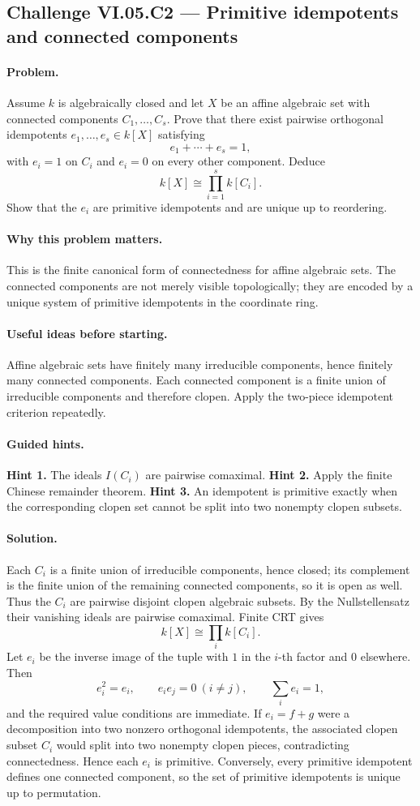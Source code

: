 \subsection*{Challenge VI.05.C2 --- Primitive idempotents and connected components}
\label{chal:vi05-c2}
\paragraph{Problem.}
Assume \(k\) is algebraically closed and let \(X\) be an affine algebraic set with connected
components \(C_1,\dots,C_s\).  Prove that there exist pairwise orthogonal idempotents
\(e_1,\dots,e_s\in k[X]\) satisfying
\[
e_1+\cdots+e_s=1,
\]
with \(e_i=1\) on \(C_i\) and \(e_i=0\) on every other component.  Deduce
\[
k[X]\cong\prod_{i=1}^s k[C_i].
\]
Show that the \(e_i\) are primitive idempotents and are unique up to reordering.
\ifdefined\FullProblemDossiers
\paragraph{Why this problem matters.}
This is the finite canonical form of connectedness for affine algebraic sets.  The connected
components are not merely visible topologically; they are encoded by a unique system of
primitive idempotents in the coordinate ring.
\paragraph{Useful ideas before starting.}
Affine algebraic sets have finitely many irreducible components, hence finitely many
connected components.  Each connected component is a finite union of irreducible components
and therefore clopen.  Apply the two-piece idempotent criterion repeatedly.
\paragraph{Guided hints.}
\textbf{Hint 1.} The ideals \(I(C_i)\) are pairwise comaximal.
\textbf{Hint 2.} Apply the finite Chinese remainder theorem.
\textbf{Hint 3.} An idempotent is primitive exactly when the corresponding clopen set cannot
be split into two nonempty clopen subsets.
\paragraph{Solution.}
Each \(C_i\) is a finite union of irreducible components, hence closed; its complement is
the finite union of the remaining connected components, so it is open as well.  Thus the
\(C_i\) are pairwise disjoint clopen algebraic subsets.  By the Nullstellensatz their
vanishing ideals are pairwise comaximal.  Finite CRT gives
\[
k[X]\cong\prod_i k[C_i].
\]
Let \(e_i\) be the inverse image of the tuple with \(1\) in the \(i\)-th factor and \(0\)
elsewhere.  Then
\[
e_i^2=e_i,\qquad e_ie_j=0\ (i\neq j),\qquad \sum_i e_i=1,
\]
and the required value conditions are immediate.
If \(e_i=f+g\) were a decomposition into two nonzero orthogonal idempotents, the associated
clopen subset \(C_i\) would split into two nonempty clopen pieces, contradicting connectedness.
Hence each \(e_i\) is primitive.  Conversely, every primitive idempotent defines one
connected component, so the set of primitive idempotents is unique up to permutation.
